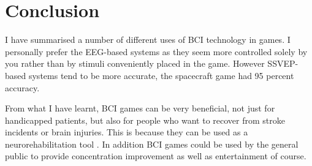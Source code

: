 \documentclass{scrartcl}
\begin{document}
\section*{Conclusion}
I have summarised a number of different uses of BCI technology in games. I personally prefer the EEG-based systems as they seem more controlled solely by you rather than by stimuli conveniently placed in the game. However SSVEP-based systems tend to be more accurate, the spacecraft game \cite{Spacecraft} had 95 percent accuracy.

From what I have learnt, BCI games can be very beneficial, not just for handicapped patients, but also for people who want to recover from stroke incidents or brain injuries. This is because they can be used as a neurorehabilitation tool \cite{Spacecraft}. In addition BCI games could be used by the general public to provide concentration improvement as well as entertainment of course.



\end{document}
